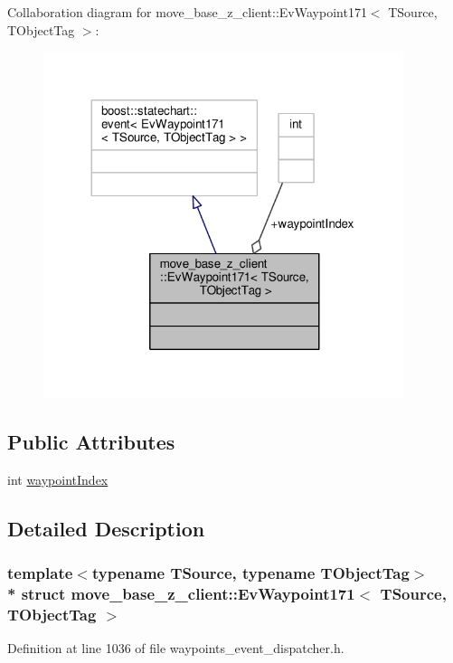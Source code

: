 Collaboration diagram for move\+\_\+base\+\_\+z\+\_\+client\+:\+:Ev\+Waypoint171$<$ T\+Source, T\+Object\+Tag $>$\+:\nopagebreak
\begin{figure}[H]
\begin{center}
\leavevmode
\includegraphics[width=299pt]{structmove__base__z__client_1_1EvWaypoint171__coll__graph}
\end{center}
\end{figure}
\subsection*{Public Attributes}
\begin{DoxyCompactItemize}
\item 
int \hyperlink{structmove__base__z__client_1_1EvWaypoint171_ad4f260dc2fe757caff5801c954181f12}{waypoint\+Index}
\end{DoxyCompactItemize}


\subsection{Detailed Description}
\subsubsection*{template$<$typename T\+Source, typename T\+Object\+Tag$>$\\*
struct move\+\_\+base\+\_\+z\+\_\+client\+::\+Ev\+Waypoint171$<$ T\+Source, T\+Object\+Tag $>$}



Definition at line 1036 of file waypoints\+\_\+event\+\_\+dispatcher.\+h.



